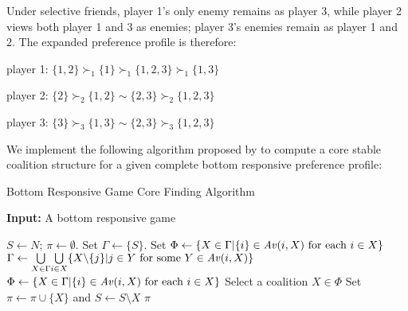 Under selective friends, player 1's only enemy remains as player 3, while
player 2 views both player 1 and 3 as enemies; player 3's enemies remain as
player 1 and 2.
The expanded preference profile is therefore:

player 1: $\{1, 2\} \succ_1 \{1\} \succ_1 \{1, 2, 3\} \succ_1 \{1, 3\} $

player 2: $\{2\} \succ_2 \{1, 2\} \sim \{2, 3\} \succ_2 \{1, 2, 3\} $

player 3: $\{3\} \succ_3 \{1, 3\} \sim \{2, 3\} \succ_3 \{1, 2, 3\}$

We implement the following algorithm proposed by  to
compute a core stable coalition structure for a given complete bottom
responsive preference profile:

\begin{algorithm}[htb]
  \caption{Bottom Responsive Game Core Finding Algorithm}
  \label{alg:bottom_responsive_core}
  \textbf{Input:} A bottom responsive game
  \begin{algorithmic}[1]

  \State $S \leftarrow N$; $\pi \leftarrow \emptyset$.
    \State \label{bottom_responsive_core:select_begin} Set $\Gamma \leftarrow \{S\}$.
    \State Set $\Phi \leftarrow \lbrace X \in \Gamma | \{i\} \in \mathit{Av}(i, X) \text{ for each } i \in X \rbrace$
    \While {$\Phi = \emptyset$}
      \State $\Gamma \leftarrow \underset{X \in \Gamma}{\bigcup} \underset{i \in X}{\bigcup} \{ X \text{\textbackslash} \{j\} | j \in Y \text{ for some } Y \in \mathit{Av}(i, X)\}$
      \State $\Phi \leftarrow \lbrace X \in \Gamma | \{i\} \in \mathit{Av}(i, X) \text{ for each } i \in X \rbrace$
    \EndWhile
    \State \label{bottom_responsive_core:select_end} Select a coalition
      $X \in \Phi$
    \State \label{bottom_responsive_core:reduce} Set
      $\pi \leftarrow \pi \cup \lbrace X \rbrace$ and
      $S \leftarrow  S \setminus X$
  \EndWhile
  \State \Return $\pi$

  \end{algorithmic}
\end{algorithm}


